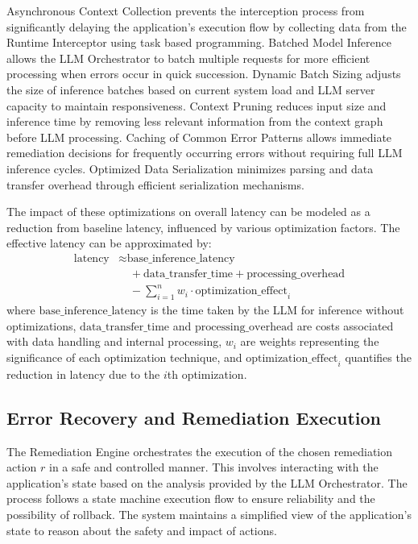 Asynchronous Context Collection prevents the interception process from significantly delaying the application's execution flow by collecting data from the Runtime Interceptor using task based programming. Batched Model Inference allows the LLM Orchestrator to batch multiple requests for more efficient processing when errors occur in quick succession. Dynamic Batch Sizing adjusts the size of inference batches based on current system load and LLM server capacity to maintain responsiveness. Context Pruning reduces input size and inference time by removing less relevant information from the context graph before LLM processing. Caching of Common Error Patterns allows immediate remediation decisions for frequently occurring errors without requiring full LLM inference cycles. Optimized Data Serialization minimizes parsing and data transfer overhead through efficient serialization mechanisms.

The impact of these optimizations on overall latency can be modeled as a reduction from baseline latency, influenced by various optimization factors. The effective latency can be approximated by:
\begin{equation}
\begin{split}
\text{latency} &\approx \text{base\_inference\_latency} \\
&\quad + \text{data\_transfer\_time} + \text{processing\_overhead} \\
&\quad - \sum_{i=1}^{n} w_i \cdot \text{optimization\_effect}_i
\end{split}
\end{equation}
where $\text{base\_inference\_latency}$ is the time taken by the LLM for inference without optimizations, $\text{data\_transfer\_time}$ and $\text{processing\_overhead}$ are costs associated with data handling and internal processing, $w_i$ are weights representing the significance of each optimization technique, and $\text{optimization\_effect}_i$ quantifies the reduction in latency due to the $i$th optimization.

\subsection{Error Recovery and Remediation Execution}
The Remediation Engine orchestrates the execution of the chosen remediation action $r$ in a safe and controlled manner. This involves interacting with the application's state based on the analysis provided by the LLM Orchestrator. The process follows a state machine execution flow to ensure reliability and the possibility of rollback. The system maintains a simplified view of the application's state to reason about the safety and impact of actions.

